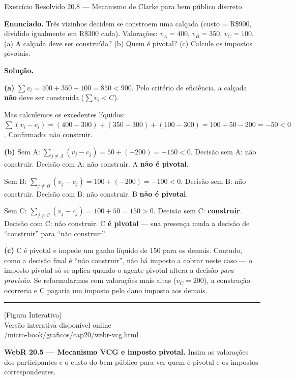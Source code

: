 \documentclass[11pt,twoside,openright]{book}
\newcommand{\figurePlaceholder}[1]{%
  \begin{center}
    \begin{tcolorbox}[
      width=0.85\textwidth,
      colback=graybg,
      colframe=gray,
      boxrule=0.5pt,
      arc=2pt,
      halign=center,
      valign=center,
      height=5cm
    ]
      \centering
      \vfill
      {\sffamily\color{gray}\large [Figura Interativa]}\\[6pt]
      {\sffamily\small\color{gray} Versão interativa disponível online}\\[4pt]
      {\ttfamily\tiny\color{gray} #1}
      \vfill
    \end{tcolorbox}
  \end{center}
}
\begin{document}
\begin{exresolvidobox}{Exercício Resolvido 20.8 — Mecanismo de Clarke para bem público discreto}

\textbf{Enunciado.} Três vizinhos decidem se constroem uma calçada
(custo = R\$900, dividido igualmente em R\$300 cada). Valorações:
\(v_A = 400\), \(v_B = 350\), \(v_C = 100\). (a) A calçada deve ser
construída? (b) Quem é pivotal? (c) Calcule os impostos pivotais.

\textbf{Solução.}

\textbf{(a)} \(\sum v_i = 400 + 350 + 100 = 850 < 900\). Pelo critério
de eficiência, a calçada \textbf{não} deve ser construída
(\(\sum v_i < C\)).

Mas calculemos os excedentes líquidos:
\(\sum (v_i - c_i) = (400 - 300) + (350 - 300) + (100 - 300) = 100 + 50 - 200 = -50 < 0\).
Confirmado: não construir.

\textbf{(b)} Sem A:
\(\sum_{j \neq A}(v_j - c_j) = 50 + (-200) = -150 < 0\). Decisão sem A:
não construir. Decisão com A: não construir. A \textbf{não é pivotal}.

Sem B: \(\sum_{j \neq B}(v_j - c_j) = 100 + (-200) = -100 < 0\). Decisão
sem B: não construir. Decisão com B: não construir. B \textbf{não é
pivotal}.

Sem C: \(\sum_{j \neq C}(v_j - c_j) = 100 + 50 = 150 > 0\). Decisão sem
C: \textbf{construir}. Decisão com C: não construir. C \textbf{é
pivotal} --- sua presença muda a decisão de ``construir'' para ``não
construir''.

\textbf{(c)} C é pivotal e impede um ganho líquido de 150 para os
demais. Contudo, como a decisão final é ``não construir'', não há
imposto a cobrar neste caso --- o imposto pivotal só se aplica quando o
agente pivotal altera a decisão \emph{para provisão}. Se reformularmos
com valorações mais altas (\(v_C = 200\)), a construção ocorreria e C
pagaria um imposto pelo dano imposto aos demais.

\end{exresolvidobox}

\begin{center}\rule{0.5\linewidth}{0.5pt}\end{center}

\figurePlaceholder{/micro-book/graficos/cap20/webr-vcg.html}

\textbf{WebR 20.5 --- Mecanismo VCG e imposto pivotal.} Insira as
valorações dos participantes e o custo do bem público para ver quem é
pivotal e os impostos correspondentes.
\end{document}
